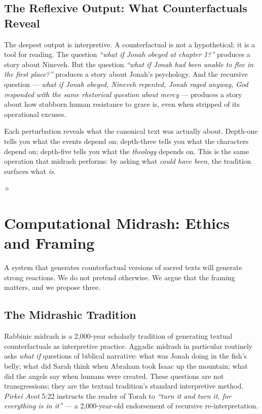 \documentclass[11pt]{article}
\theoremstyle{rukha}
\newcommand{\diamondrule}{%
  \begin{center}\vspace{0.6em}%
  {\scriptsize $\diamond$}\vspace{0.6em}\end{center}}
\begin{document}
\subsection{The Reflexive Output: What Counterfactuals Reveal}

The deepest output is interpretive. A counterfactual is not a
hypothetical; it is a tool for reading. The question
\emph{``what if Jonah obeyed at chapter 1?''} produces a story about
Nineveh. But the question \emph{``what if Jonah had been unable to flee
in the first place?''} produces a story about Jonah's psychology. And
the recursive question --- \emph{what if Jonah obeyed, Nineveh repented,
Jonah raged anyway, God responded with the same rhetorical question
about mercy} --- produces a story about how stubborn human resistance to
grace is, even when stripped of its operational excuses.

Each perturbation reveals what the canonical text was actually about.
Depth-one tells you what the events depend on; depth-three tells you
what the characters depend on; depth-five tells you what the
\emph{theology} depends on. This is the same operation that midrash
performs: by asking what \emph{could have been}, the tradition surfaces
what \emph{is}.

\diamondrule

\section{Computational Midrash: Ethics and Framing}

A system that generates counterfactual versions of sacred texts will
generate strong reactions. We do not pretend otherwise. We argue that
the framing matters, and we propose three.

\subsection{The Midrashic Tradition}

Rabbinic midrash is a 2,000-year scholarly tradition of generating
textual counterfactuals as interpretive practice. Aggadic midrash in
particular routinely asks \emph{what if} questions of biblical
narrative: what was Jonah doing in the fish's belly; what did Sarah
think when Abraham took Isaac up the mountain; what did the angels say
when humans were created. These questions are not transgressions; they
are the textual tradition's standard interpretive method. \emph{Pirkei
Avot} 5:22 instructs the reader of Torah to \emph{``turn it and turn it,
for everything is in it''} --- a 2,000-year-old endorsement of recursive
re-interpretation.
\end{document}
